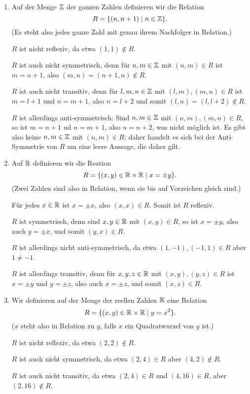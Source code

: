 \begin{bsp}
\begin{enumerate}[leftmargin=*]
  \item
   Auf der Menge $\mathbb{Z}$ der ganzen Zahlen definieren wir die Relation
   \[
    R = \{(n,n+1) \mid n \in \mathbb{Z}\}.
   \]
   (Es steht also jedes ganze Zahl mit genau ihrem Nachfolger in Relation.)
   
   $R$ ist nicht reflexiv, da etwa $(1,1) \notin R$.
   
   $R$ ist auch nicht symmetrisch, denn für $n,m \in \mathbb{Z}$ mit $(n,m) \in R$ ist $m = n+1$, also $(m,n) = (n+1,n) \notin R$.
   
   $R$ ist auch nicht transitiv, denn für $l,m,n \in \mathbb{Z}$ mit $(l,m),(m,n) \in R$ ist $m = l+1$ und $n = m+1$, also $n = l+2$ und somit $(l,n) = (l,l+2) \notin R$.
   
   $R$ ist allerdings anti-symmetrisch: Sind $n,m \in \mathbb{Z}$ mit $(n,m), (m,n) \in R$, so ist $m = n+1$ ud $n = m+1$, also $n = n+2$, was nicht möglich ist. Es gibt also keine $n,m \in \mathbb{Z}$ mit $(n,m) \in R$; daher handelt es sich bei der Anti-Symmetrie von $R$ um eine leere Aussage, die daher gilt.
   
  
  \item
   Auf $\mathbb{R}$ definieren wir die Reation
   \[
    R
    = \{(x,y) \in \mathbb{R} \times \mathbb{R} \mid x = \pm y\}.
   \]
   (Zwei Zahlen sind also in Relation, wenn sie bis auf Vorzeichen gleich sind.)
   
   Für jedes $x \in \mathbb{R}$ ist $x = \pm x$, also $(x,x) \in R$. Somit ist $R$ reflexiv.
   
   $R$ ist symmetrisch, denn sind $x,y \in \mathbb{R}$ mit $(x,y) \in R$, so ist $x = \pm y$, also auch $y = \pm x$, und somit $(y,x) \in R$.
   
   $R$ ist allerdings nicht anti-symmetrisch, da etwa $(1,-1), (-1,1) \in R$ aber $1 \neq -1$.
   
   $R$ ist allerdings transitiv, denn für $x,y,z \in \mathbb{R}$ mit $(x,y), (y,z) \in R$ ist $x = \pm y$ und $y = \pm z$, also auch $x = \pm z$, und somit $(x,z) \in R$.
   
  \item
   Wir definieren auf der Menge der reellen Zahlen $\mathbb{R}$ eine Relation
   \[
    R = \{(x,y) \in \mathbb{R} \times \mathbb{R} \mid y = x^2\}.
   \]
   ($x$ steht also in Relation zu $y$, falls $x$ ein Quadratwurzel von $y$ ist.)
   
   $R$ ist nicht reflexiv, da etwa $(2,2) \notin R$.
   
   $R$ ist auch nicht symmetrisch, da etwa $(2,4) \in R$ aber $(4,2) \notin R$.
   
   $R$ ist auch nicht transitiv, da etwa $(2,4) \in R$ und $(4,16) \in R$, aber $(2,16) \notin R$.
   

\end{enumerate}
\end{bsp}

